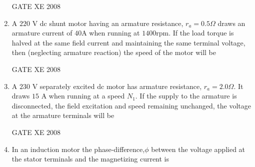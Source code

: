 \documentclass[12pt]{article}
\begin{document}
\begin{enumerate}[label=Q\arabic*.]
\begin{enumerate}[label=(\Alph*)]
\end{enumerate}

GATE XE 2008
\item A $220$ V dc shunt motor having an armature resistance, $r_{a}=0.5\Omega$ draws an armature current of $40$A when running at $1400$rpm. If the load torque is halved at the same field current and maintaining the same terminal voltage, then (neglecting armature reaction) the speed of the motor will be

\begin{enumerate}[label=(\Alph*)]
\end{enumerate}

GATE XE 2008
\item A $230$ V separately excited dc motor has armature resistance, $r_{a} = 2.0\Omega$. It draws $15$ A when running at a speed $N_{1}$. If the supply to the armature is disconnected, the field excitation and speed remaining unchanged, the voltage at the armature terminals will be

\begin{enumerate}[label=(\Alph*)]
\end{enumerate}

GATE XE 2008
\item In an induction motor the phase-difference,$\phi$ between the voltage applied at the stator terminals and the magnetizing current is


\end{enumerate}
\end{document}
